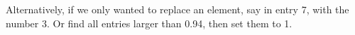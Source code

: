 Alternatively, if we only wanted to replace an element, say in entry 7, with the number 3.
Or find all entries larger than 0.94, then set them to 1.